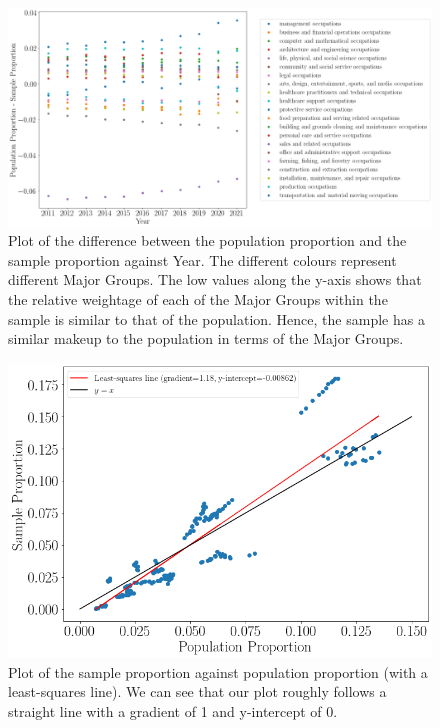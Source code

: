 \documentclass[11pt]{article}
\begin{document}
\begin{figure}[!htb]
	\centering
	\includegraphics[width=17cm]{Figures/sample test2.png}
	\caption{Plot of the difference between the population proportion and the sample proportion against Year. The different colours represent different Major Groups. The low values along the y-axis shows that the relative weightage of each of the Major Groups within the sample is similar to that of the population. Hence, the sample has a similar makeup to the population in terms of the Major Groups.}
	\label{fig:relativeweightage}
\end{figure}

\begin{figure}[!htb]
	\centering
	\includegraphics[width=15cm]{Figures/Sample Proportion against Population Proportion2.png}
	\caption{Plot of the sample proportion against population proportion (with a least-squares line). We can see that our plot roughly follows a straight line with a gradient of 1 and y-intercept of 0.}
	\label{fig:sampleprop vs popprop}
\end{figure}
\end{document}
